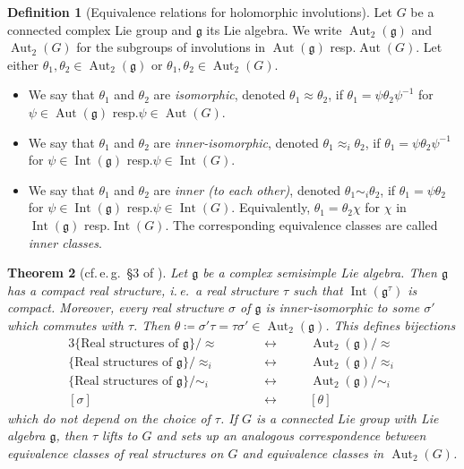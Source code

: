 \documentclass{amsart}
\newcommand{\ie}{i.\,e.}
\newcommand{\eg}{e.\,g.}
\newcommand{\cf}{cf.\,}
\newcommand{\Aut}{\operatorname{Aut}}
\newcommand{\g}{\mathfrak{g}}
\newcommand{\Int}{\operatorname{Int}}
\newcommand{\inv}{^{-1}}
\theoremstyle{definition}
\newtheorem{defn}{Definition}[section]
\theoremstyle{plain}
\newtheorem{thm}[defn]{Theorem}
\theoremstyle{remark}
\begin{document}
\begin{defn}[Equivalence relations for holomorphic involutions]
    Let $G$ be a connected complex Lie group and $\g$ its Lie algebra. We write $\Aut_2(\g)$ and $\Aut_2(G)$ for the subgroups of involutions in $\Aut(\g)$ resp.\;$\Aut(G)$. Let either $\theta_1,\theta_2 \in\Aut_2(\g)$ or $\theta_1,\theta_2 \in \Aut_2(G)$.
    \begin{itemize}
        \item[(i)] We say that $\theta_1$ and $\theta_2$ are \emph{isomorphic}, denoted $\theta_1\approx \theta_2$, if $\theta_1 = \psi \theta_2 \psi\inv$ for $\psi \in \Aut(\g)$ resp.\;$\psi \in \Aut(G)$.
        \item[(ii)] We say that $\theta_1$ and $\theta_2$ are \emph{inner-isomorphic}, denoted $\theta_1\approx_i \theta_2$, if $\theta_1 = \psi \theta_2 \psi\inv$ for $\psi \in \Int(\g)$ resp.\;$\psi \in \Int(G)$.
        \item[(iii)] We say that $\theta_1$ and $\theta_2$ are \emph{inner (to each other)}, denoted $\theta_1\sim_i \theta_2$, if $\theta_1 = \psi \theta_2$ for $\psi \in \Int(\g)$ resp.\;$\psi \in \Int(G)$. Equivalently, $\theta_1 = \theta_2 \chi$ for $\chi$ in $\Int(\g)$ resp.\;$\Int(G)$. The corresponding equivalence classes are called \emph{inner classes}.
    \end{itemize}
\end{defn}
\begin{thm}[\cf \eg\ \S3 of \cite{Onishchik2004_real}]
\label{thm:Cartan_correspondence}
    Let $\g$ be a complex semisimple Lie algebra. Then $\g$ has a \emph{compact real structure}, \ie\ a real structure $\tau$ such that $\Int(\g^\tau)$ is compact. Moreover, every real structure $\sigma$ of $\g$ is inner-isomorphic to some $\sigma'$ which commutes with $\tau$. Then $\theta\coloneqq \sigma'\tau = \tau\sigma' \in \Aut_2(\g)$. This defines bijections
    \begin{alignat*}{3}
        \{\text{Real structures of $\g$}\}/\!\approx\;&
        \quad
        &&\longleftrightarrow
        \quad
        && \Aut_2(\g)/\!\approx
        \\
        \{\text{Real structures of $\g$}\}/\!\approx_i&
        \quad
        &&\longleftrightarrow
        \quad
        && \Aut_2(\g)/\!\approx_i
        \\
        \{\text{Real structures of $\g$}\}/\!\sim_i&
        \quad
        &&\longleftrightarrow
        \quad
        && \Aut_2(\g)/\!\sim_i
        \\
        [\sigma]&
        \quad
        &&\longleftrightarrow
        \quad
        && [\theta]
    \end{alignat*}
    which do not depend on the choice of $\tau$.
    If $G$ is a connected Lie group with Lie algebra $\g$, then $\tau$ lifts to $G$ and sets up an analogous correspondence between equivalence classes of real structures on $G$ and equivalence classes in $\Aut_2(G)$.
\end{thm}
\end{document}
